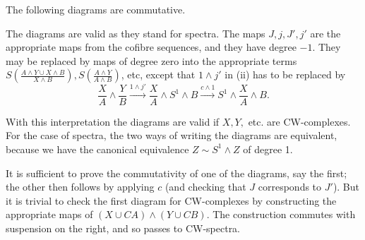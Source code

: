 \documentclass[../main]{subfiles}
\begin{document}
\begin{lemma}\label{lem:p3c09.9}  The following diagrams are commutative.
\begin{center}
\end{center}
\begin{center}
\end{center}
\end{lemma}

\begin{notes}  The diagrams are valid as they stand for spectra. The maps $J, j, J', j'$ are the appropriate maps from the cofibre sequences, and they have degree $-1$. They may be replaced by maps of degree zero into the appropriate terms $S(\frac{A \wedge Y \cup X \wedge B}{X \wedge B}), S(\frac{A \wedge Y}{A \wedge B})$, etc, except that $1 \wedge j'$ in (ii) has to be replaced by \[\frac{X}{A} \wedge \frac{Y}{B} \xrightarrow{1\wedge j'} \frac{X}{A} \wedge S^1 \wedge B \xrightarrow{c \wedge 1} S^1 \wedge \frac{X}{A} \wedge B.\]

With this interpretation the diagrams are valid if $X, Y,$ etc. are CW-complexes.  For the case of spectra, the two ways of writing the diagrams are equivalent, because we have the canonical equivalence $Z \sim S^1 \wedge Z$ of degree 1.

\par It is sufficient to prove the commutativity of one of the diagrams, say the first; the other then follows by applying $c$ (and checking that $J$ corresponds to $J'$). But it is trivial to check the first diagram for CW-complexes by constructing the appropriate maps of $(X \cup CA) \wedge (Y \cup CB)$. The construction commutes with suspension on the right, and so passes
to CW-spectra.

\end{notes}
\end{document}
